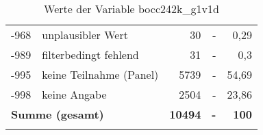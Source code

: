 \begin{longtable}{Xlrrr}
       -968 & unplausibler Wert & 30 & - & 0,29 \\

       -989 & filterbedingt fehlend & 31 & - & 0,3 \\

       -995 & keine Teilnahme (Panel) & 5739 & - & 54,69 \\

       -998 & keine Angabe & 2504 & - & 23,86 \\

     \midrule
     \multicolumn{2}{l}{\textbf{Summe (gesamt)}} & \textbf{10494} & \textbf{-} & \textbf{100} \\
     \bottomrule
     \caption{Werte der Variable bocc242k\_g1v1d}
     \end{longtable}
     
